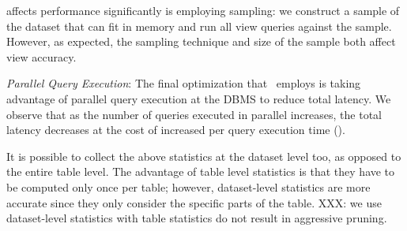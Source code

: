 \begin{denselist}
  affects performance significantly is employing sampling: we  
  construct a sample of the dataset
  that can fit in memory and run all view queries against the sample. However, as
  expected, the sampling technique and size of the sample both affect
  view accuracy. 
  \item {\it Parallel Query Execution}: The final optimization that
  \SeeDB\ employs is taking advantage of parallel query execution 
  at the DBMS to reduce total latency.
  We observe that as the number of queries executed in parallel
  increases, the total latency decreases at the cost of
  increased per query execution time ().
\end{denselist}



It is possible to collect the above statistics at the dataset level too, as
opposed to the entire table level. The advantage of table level statistics is
that they have to be computed only once per table; however, dataset-level
statistics are more accurate since they only consider the specific parts of the
table. XXX: we use dataset-level statistics with table statistics do not result
in aggressive pruning. 
